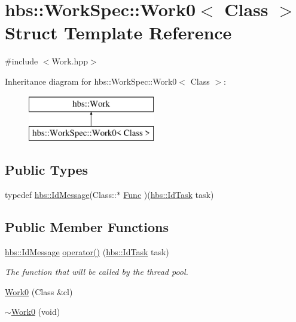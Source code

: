 \hypertarget{structhbs_1_1_work_spec_1_1_work0}{\section{hbs\-:\-:Work\-Spec\-:\-:Work0$<$ Class $>$ Struct Template Reference}
\label{structhbs_1_1_work_spec_1_1_work0}
}


{\ttfamily \#include $<$Work.\-hpp$>$}

Inheritance diagram for hbs\-:\-:Work\-Spec\-:\-:Work0$<$ Class $>$\-:\begin{figure}[H]
\begin{center}
\leavevmode
\includegraphics[height=2.000000cm]{structhbs_1_1_work_spec_1_1_work0}
\end{center}
\end{figure}
\subsection*{Public Types}
\begin{DoxyCompactItemize}
\item 
typedef \hyperlink{namespacehbs_a6d744a52db9bca0a9752a009118641f4}{hbs\-::\-Id\-Message}(Class\-::$\ast$ \hyperlink{structhbs_1_1_work_spec_1_1_work0_a0dd8e012a697002cfeb11b4da10f7f05}{Func} )(\hyperlink{namespacehbs_aab8d06205ac2b0b14186327fd6c1c0d6}{hbs\-::\-Id\-Task} task)
\end{DoxyCompactItemize}
\subsection*{Public Member Functions}
\begin{DoxyCompactItemize}
\item 
\hyperlink{namespacehbs_a6d744a52db9bca0a9752a009118641f4}{hbs\-::\-Id\-Message} \hyperlink{structhbs_1_1_work_spec_1_1_work0_af20a59b9e8106ba7d0e5104cbf0dd9a9}{operator()} (\hyperlink{namespacehbs_aab8d06205ac2b0b14186327fd6c1c0d6}{hbs\-::\-Id\-Task} task)
\begin{DoxyCompactList}\small\item\em The function that will be called by the thread pool. \end{DoxyCompactList}\item 
\hyperlink{structhbs_1_1_work_spec_1_1_work0_aca4ac2d5d65fe23645bcdd35c54ffbda}{Work0} (Class \&cl)
\item 
\hyperlink{structhbs_1_1_work_spec_1_1_work0_a53f164c8c493368c360b39205a36b9bd}{$\sim$\-Work0} (void)
\end{DoxyCompactItemize}
